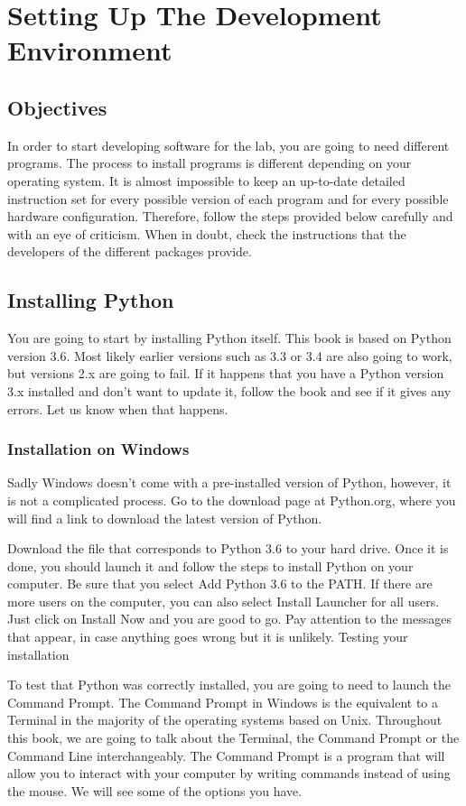 \chapter{Setting Up The Development Environment}
\section{Objectives}
In order to start developing software for the lab, you are going to need different programs. The process to install programs is different depending on your operating system. It is almost impossible to keep an up-to-date detailed instruction set for every possible version of each program and for every possible hardware configuration. Therefore, follow the steps provided below carefully and with an eye of criticism. When in doubt, check the instructions that the developers of the different packages provide.

\section{Installing Python}
You are going to start by installing Python itself. This book is based on Python version 3.6. Most likely earlier versions such as 3.3 or 3.4 are also going to work, but versions 2.x are going to fail. If it happens that you have a Python version 3.x installed and don’t want to update it, follow the book and see if it gives any errors. Let us know when that happens.

\subsection{Installation on Windows}
Sadly Windows doesn’t come with a pre-installed version of Python, however, it is not a complicated process. Go to the download page at Python.org, where you will find a link to download the latest version of Python.

Download the file that corresponds to Python 3.6 to your hard drive. Once it is done, you should launch it and follow the steps to install Python on your computer. Be sure that you select Add Python 3.6 to the PATH. If there are more users on the computer, you can also select Install Launcher for all users. Just click on Install Now and you are good to go. Pay attention to the messages that appear, in case anything goes wrong but it is unlikely.
Testing your installation

To test that Python was correctly installed, you are going to need to launch the Command Prompt. The Command Prompt in Windows is the equivalent to a Terminal in the majority of the operating systems based on Unix. Throughout this book, we are going to talk about the Terminal, the Command Prompt or the Command Line interchangeably. The Command Prompt is a program that will allow you to interact with your computer by writing commands instead of using the mouse. We will see some of the options you have.

